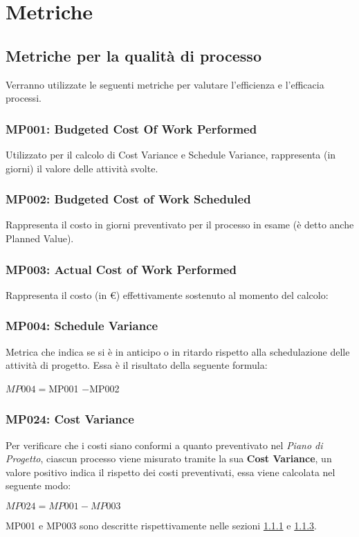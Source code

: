 \chapter{Metriche}

\section{Metriche per la qualità di processo}\label{processo}
Verranno utilizzate le seguenti metriche per valutare l'efficienza e l'efficacia 
processi.
\subsection{MP001: Budgeted Cost Of Work Performed}\label{bcwp}
Utilizzato per il calcolo di Cost Variance e Schedule Variance, rappresenta (in giorni) il valore delle attività svolte.

\subsection{MP002: Budgeted Cost of Work Scheduled}\label{bcws}
Rappresenta il costo in giorni preventivato per il processo in esame (è detto anche Planned Value).

\subsection{MP003: Actual Cost of Work Performed}\label{acwp}
Rappresenta il costo (in \euro) effettivamente sostenuto al momento del calcolo:

\subsection{MP004: Schedule Variance}
Metrica che indica se si è in anticipo o in ritardo rispetto alla schedulazione delle attività di progetto.
Essa è il risultato della seguente formula:\\
\begin{center}
	
	$MP004 = ${MP001} $-${MP002}
	
\end{center}

\subsection{MP024: Cost Variance}
Per verificare che i costi siano conformi a quanto preventivato nel \textit{Piano di Progetto}, ciascun processo viene misurato tramite la sua \textbf{Cost Variance}, un valore positivo indica il rispetto dei costi preventivati, essa viene calcolata nel seguente modo:\\ 
\begin{center}
	\begin{math}
	MP024 = MP001 - MP003
	\end{math}
\end{center}
MP001 e MP003 sono descritte rispettivamente nelle sezioni \ref{bcwp} e \ref{acwp}.

